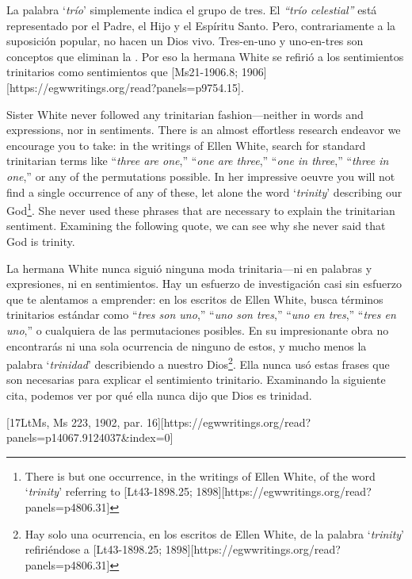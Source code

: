 La palabra ‘\textit{trío}’ simplemente indica el grupo de tres. El \textit{“trío celestial”} está representado por el Padre, el Hijo y el Espíritu Santo. Pero, contrariamente a la suposición popular, no hacen un Dios vivo. Tres-en-uno y uno-en-tres son conceptos que eliminan la . Por eso la hermana White se refirió a los sentimientos trinitarios como sentimientos que [Ms21-1906.8; 1906][https://egwwritings.org/read?panels=p9754.15].


Sister White never followed any trinitarian fashion—neither in words and expressions, nor in sentiments. There is an almost effortless research endeavor we encourage you to take: in the writings of Ellen White, search for standard trinitarian terms like “\textit{three are one},” “\textit{one are three},” “\textit{one in three},” “\textit{three in one},” or any of the permutations possible. In her impressive oeuvre you will not find a single occurrence of any of these, let alone the word ‘\textit{trinity}’ describing our God\footnote{There is but one occurrence, in the writings of Ellen White, of the word ‘\textit{trinity}’ referring to [Lt43-1898.25; 1898][https://egwwritings.org/read?panels=p4806.31]}. She never used these phrases that are necessary to explain the trinitarian sentiment. Examining the following quote, we can see why she never said that God is trinity.


La hermana White nunca siguió ninguna moda trinitaria—ni en palabras y expresiones, ni en sentimientos. Hay un esfuerzo de investigación casi sin esfuerzo que te alentamos a emprender: en los escritos de Ellen White, busca términos trinitarios estándar como “\textit{tres son uno},” “\textit{uno son tres},” “\textit{uno en tres},” “\textit{tres en uno},” o cualquiera de las permutaciones posibles. En su impresionante obra no encontrarás ni una sola ocurrencia de ninguno de estos, y mucho menos la palabra ‘\textit{trinidad}’ describiendo a nuestro Dios\footnote{Hay solo una ocurrencia, en los escritos de Ellen White, de la palabra ‘\textit{trinity}’ refiriéndose a [Lt43-1898.25; 1898][https://egwwritings.org/read?panels=p4806.31]}. Ella nunca usó estas frases que son necesarias para explicar el sentimiento trinitario. Examinando la siguiente cita, podemos ver por qué ella nunca dijo que Dios es trinidad.


[17LtMs, Ms 223, 1902, par. 16][https://egwwritings.org/read?panels=p14067.9124037&index=0]


